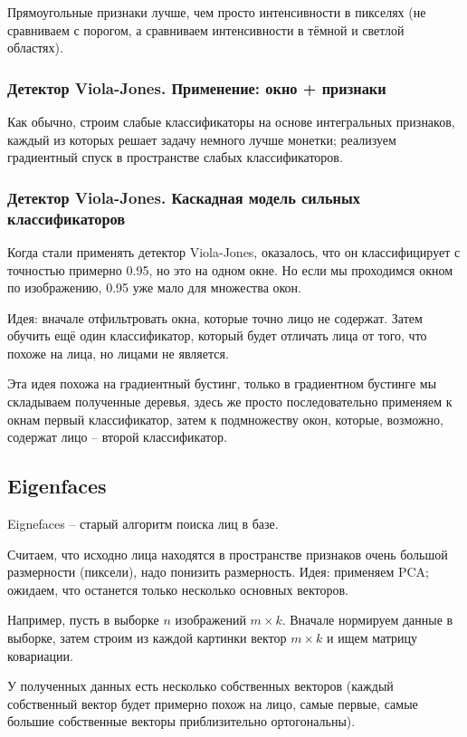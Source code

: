 \documentclass[main.tex]{subfiles}
\begin{document}
Прямоугольные признаки лучше, чем просто интенсивности в пикселях (не сравниваем с порогом, а сравниваем интенсивности в тёмной и светлой областях).

\subsubsection{Детектор Viola-Jones. Применение: окно + признаки }

Как обычно, строим слабые классификаторы на основе интегральных признаков, каждый из которых решает задачу немного лучше монетки; реализуем градиентный спуск в пространстве слабых классификаторов.

\subsubsection{Детектор Viola-Jones. Каскадная модель сильных классификаторов}

Когда стали применять детектор Viola-Jones, оказалось, что он классифицирует с точностью примерно 0.95, но это на одном окне.
Но если мы проходимся окном по изображению, 0.95 уже мало для множества окон.

Идея: вначале отфильтровать окна, которые точно лицо не содержат.
Затем обучить ещё один классификатор, который будет отличать лица от того, что похоже на лица, но лицами не является.

Эта идея похожа на градиентный бустинг, только в градиентном бустинге мы складываем полученные деревья, здесь же просто последовательно применяем к окнам первый классификатор, затем к подмножеству окон, которые, возможно, содержат лицо -- второй классификатор.

\subsection{Eigenfaces}

Eignefaces -- старый алгоритм поиска лиц в базе.

Считаем, что исходно лица находятся в пространстве признаков очень большой размерности (пиксели), надо понизить размерность.
Идея: применяем PCA; ожидаем, что останется только несколько основных векторов.

Например, пусть в выборке $ n $ изображений $ m \times k $.
Вначале нормируем данные в выборке, затем строим из каждой картинки вектор $ m \times k $ и ищем матрицу ковариации.

У полученных данных есть несколько собственных векторов (каждый собственный вектор будет примерно похож на лицо, самые первые, самые большие собственные векторы приблизительно ортогональны).
\end{document}
